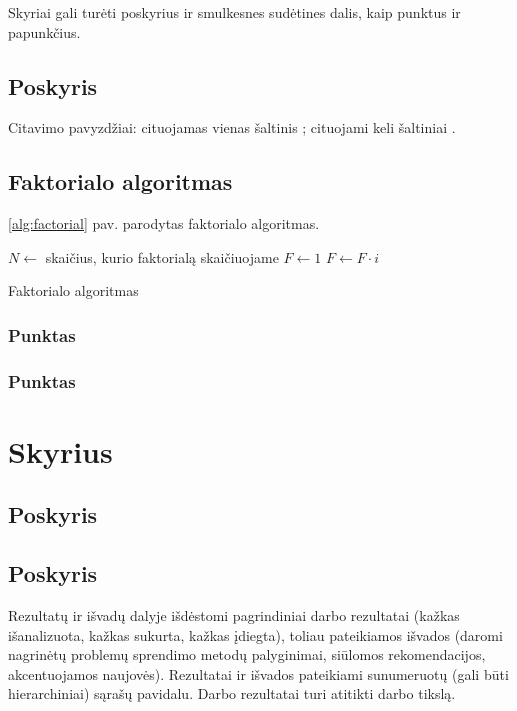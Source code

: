 \documentclass{VUMIFPSbakalaurinis}
\begin{document}
Skyriai gali turėti poskyrius ir smulkesnes sudėtines dalis, kaip punktus ir
papunkčius.

\subsection{Poskyris}
Citavimo pavyzdžiai: cituojamas vienas šaltinis \cite{PvzStraipsnLt}; cituojami
keli šaltiniai \cite{PvzStraipsnEn, PvzKonfLt, PvzKonfEn, PvzKnygLt, PvzKnygEn,
PvzElPubLt, PvzElPubEn, PvzMagistrLt, PvzPhdEn}.

\subsection{Faktorialo algoritmas}

\ref{alg:factorial} pav. parodytas faktorialo algoritmas.

\begin{algorithm}
\begin{algorithmic}[1] %
\State $N\gets$ skaičius, kurio faktorialą skaičiuojame
\State $F\gets 1$
    \State $F\gets F \cdot i$
\EndFor
\end{algorithmic}
\caption{Faktorialo algoritmas}
\label{alg:factorial}
\end{algorithm}

\subsubsection{Punktas}
\subsubsection{Punktas}
\section{Skyrius}
\subsection{Poskyris}
\subsection{Poskyris}

Rezultatų ir išvadų dalyje išdėstomi pagrindiniai darbo rezultatai (kažkas
išanalizuota, kažkas sukurta, kažkas įdiegta), toliau pateikiamos išvados
(daromi nagrinėtų problemų sprendimo metodų palyginimai, siūlomos
rekomendacijos, akcentuojamos naujovės). Rezultatai ir išvados pateikiami
sunumeruotų (gali būti hierarchiniai) sąrašų pavidalu. Darbo rezultatai turi
atitikti darbo tikslą.
\end{document}
